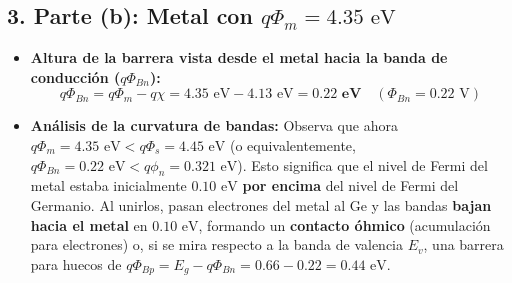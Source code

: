 \documentclass[11pt,a4paper]{article}
\begin{document}
\subsection*{3. Parte (b): Metal con $q\Phi_m = 4.35\text{ eV}$}
\begin{itemize}
    \item \textbf{Altura de la barrera vista desde el metal hacia la banda de conducción ($q\Phi_{Bn}$):}
    \[
    q\Phi_{Bn} = q\Phi_m - q\chi = 4.35\text{ eV} - 4.13\text{ eV} = \mathbf{0.22\text{ eV}} \quad (\Phi_{Bn} = 0.22\text{ V})
    \]
    \item \textbf{Análisis de la curvatura de bandas:}
    Observa que ahora $q\Phi_m = 4.35\text{ eV} < q\Phi_s = 4.45\text{ eV}$ (o equivalentemente, $q\Phi_{Bn} = 0.22\text{ eV} < q\phi_n = 0.321\text{ eV}$). Esto significa que el nivel de Fermi del metal estaba inicialmente $0.10\text{ eV}$ \textbf{por encima} del nivel de Fermi del Germanio. Al unirlos, pasan electrones del metal al Ge y las bandas \textbf{bajan hacia el metal} en $0.10\text{ eV}$, formando un \textbf{contacto óhmico} (acumulación para electrones) o, si se mira respecto a la banda de valencia $E_v$, una barrera para huecos de $q\Phi_{Bp} = E_g - q\Phi_{Bn} = 0.66 - 0.22 = 0.44\text{ eV}$.
\end{itemize}
\end{document}

